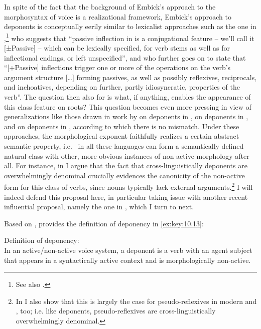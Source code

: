 \documentclass[output=paper]{langsci/langscibook}
\begin{document}
In spite of the fact that the background of Embick’s approach to the
morphosyntax of voice is a realizational framework, Embick’s approach to
deponents is conceptually eerily similar to lexicalist approaches such as the
one in \citet[121--122]{Kiparsky2005},\footnote{See also
\citet{SadlerSpencer2001}.} who suggests that “passive inflection in  is a
conjugational feature – we’ll call it [±Passive] – which can be lexically
specified, for verb stems as well as for inflectional endings, or left
unspecified”, and who further goes on to state that “[+Passive] inflections
trigger one or more of the operations on the verb’s argument structure [\dots]
forming passives, as well as possibly reflexives, reciprocals, and inchoatives,
depending on further, partly idiosyncratic, properties of the verb”. The
question then also for \citeauthor{Embick1997} is what, if anything, enables
the appearance of this class feature on roots? This question becomes even more
pressing in view of generalizations like those drawn in work by
\textcite{Xuetal2007} on deponents in , \citet{Kallulli2013} on deponents
in , and \citet{ZomAle2014} on deponents in , according to which
there is no mismatch. Under these approaches, the morphological exponent
faithfully realizes a certain abstract semantic property, i.e.\ 
in all these languages can form a semantically defined natural class with
other, more obvious instances of non-active morphology after all.  For
instance, in \citet{Kallulli2013} I argue that the fact that
cross-linguistically deponents are overwhelmingly denominal crucially evidences
the canonicity of the non-active form for this class of verbs, since nouns
typically lack external arguments.\footnote{In \citet{Kallulli2013} I also show
    that this is largely the case for pseudo-reflexives in modern  and
    , too; i.e.  like deponents, pseudo-reflexives are
cross-linguistically overwhelmingly denominal.} I will indeed defend this
proposal here, in particular taking issue with another recent influential
proposal, namely the one in \citet{Grestenberger2014,Grestenberger2018a}, which
I turn to next.\largerpage[-3]

Based on \citet{Grestenberger2014}, \textcite{Grestenberger2018a} provides the
definition of deponency in \eqref{ex:key:10.13}:

\ea%
    \label{ex:key:10.13} Definition of deponency:\\
    In an active/non-active voice system, a deponent is a verb with an agent
    subject that appears in a syntactically active context and is
    morpho\-lo\-gi\-cal\-ly non-active.
\z
\end{document}
